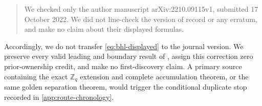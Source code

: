\begin{quote}\small
We checked only the author manuscript arXiv:2210.09115v1, submitted
17 October 2022.  We did not line-check the version of record or any
erratum, and make no claim about their displayed formulas.
\end{quote}
Accordingly, we do not transfer \eqref{eq:bhl-displayed} to the journal
version.  We preserve every valid leading and boundary result of
\citet{ban2023boundary}, assign this correction zero prior-ownership credit,
and make no first-discovery claim.  A primary source containing the exact
\(\mathbb Z_q\) extension and complete accumulation theorem, or the same
golden separation theorem, would trigger the conditional duplicate stop
recorded in \cref{app:route-chronology}.
